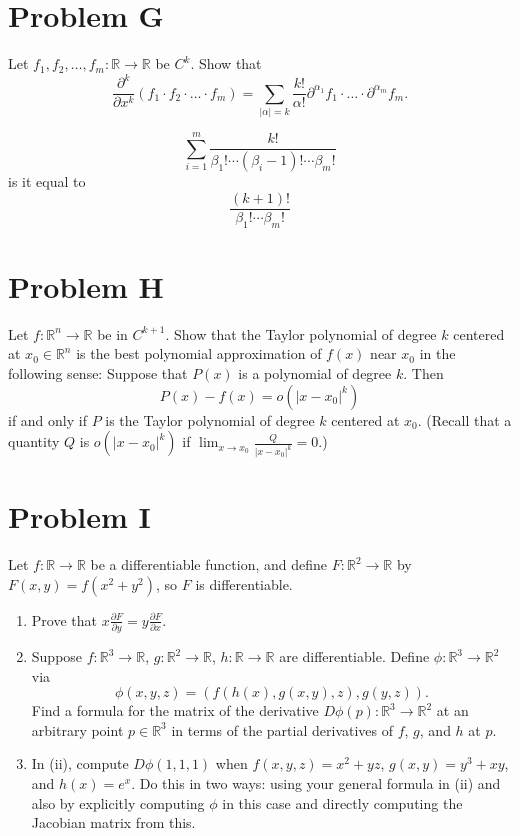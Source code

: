 \documentclass[lang=cn,11pt]{template}
\begin{document}
\section*{Problem G}
Let $f_1, f_2, \ldots, f_m : \mathbb{R} \to \mathbb{R}$ be $C^k$. Show that
\[
\frac{\partial^k}{\partial x^k}(f_1 \cdot f_2 \cdot \ldots \cdot f_m) = \sum_{|\alpha| = k} \frac{k!}{\alpha!} \partial^{\alpha_1} f_1 \cdot \ldots \cdot \partial^{\alpha_m} f_m.
\]


$$
\sum_{i=1}^m \frac{k!}{\beta_1 ! \cdots (\beta_i- 1)! \cdots \beta_m !}
$$
is it equal to 
$$
 \frac{(k+1)!}{\beta_1 !  \cdots \beta_m !}
$$


\section*{Problem H}
Let $f : \mathbb{R}^n \to \mathbb{R}$ be in $C^{k+1}$. Show that the Taylor polynomial of degree $k$ centered at $x_0 \in \mathbb{R}^n$ is the best polynomial approximation of $f(x)$ near $x_0$ in the following sense: Suppose that $P(x)$ is a polynomial of degree $k$. Then
\[
P(x) - f(x) = o(|x - x_0|^k)
\]
if and only if $P$ is the Taylor polynomial of degree $k$ centered at $x_0$. (Recall that a quantity $Q$ is $o(|x - x_0|^k)$ if $\lim_{x \to x_0} \frac{Q}{|x - x_0|^k} = 0$.)


\section*{Problem I}
Let $f : \mathbb{R} \to \mathbb{R}$ be a differentiable function, and define $F : \mathbb{R}^2 \to \mathbb{R}$ by $F(x, y) = f(x^2 + y^2)$, so $F$ is differentiable.

\begin{enumerate}
    \item Prove that $x \frac{\partial F}{\partial y} = y \frac{\partial F}{\partial x}$.
    \item Suppose $f : \mathbb{R}^3 \to \mathbb{R}$, $g : \mathbb{R}^2 \to \mathbb{R}$, $h : \mathbb{R} \to \mathbb{R}$ are differentiable. Define $\phi : \mathbb{R}^3 \to \mathbb{R}^2$ via
    \[
    \phi(x, y, z) = (f(h(x), g(x, y), z), g(y, z)).
    \]
    Find a formula for the matrix of the derivative $D\phi(p) : \mathbb{R}^3 \to \mathbb{R}^2$ at an arbitrary point $p \in \mathbb{R}^3$ in terms of the partial derivatives of $f$, $g$, and $h$ at $p$.
    \item In (ii), compute $D\phi(1, 1, 1)$ when $f(x, y, z) = x^2 + yz$, $g(x, y) = y^3 + xy$, and $h(x) = e^x$. Do this in two ways: using your general formula in (ii) and also by explicitly computing $\phi$ in this case and directly computing the Jacobian matrix from this.
\end{enumerate}
\end{document}
